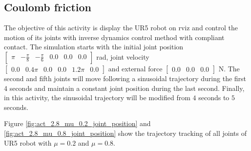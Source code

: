 \subsection{Coulomb friction}
The objective of this activity is display the UR5 robot on rviz and control the motion of its joints with inverse dynamics control method with compliant contact. The simulation starts with the initial joint position $\begin{bmatrix} \pi & -\frac{\pi}{8} & -\frac{\pi}{6} & 0.0 & 0.0 & 0.0 \end{bmatrix}$ rad, joint velocity $\begin{bmatrix} 0.0 & 0.4\pi & 0.0 & 0.0 & 1.2\pi & 0.0 \end{bmatrix}$ and external force $\begin{bmatrix} 0.0 & 0.0 & 0.0 \end{bmatrix}$ N. The second and fifth joints will move following a sinusoidal trajectory during the first 4 seconds and maintain a constant joint position during the last second. Finally, in this activity, the sinusoidal trajectory will be modified from $4$ seconds to $5$ seconds.

Figure \ref{fig:act_2.8_mu_0.2_joint_position} and \ref{fig:act_2.8_mu_0.8_joint_position} show the trajectory tracking of all joints of UR5 robot with $\mu=0.2$ and $\mu=0.8$.


